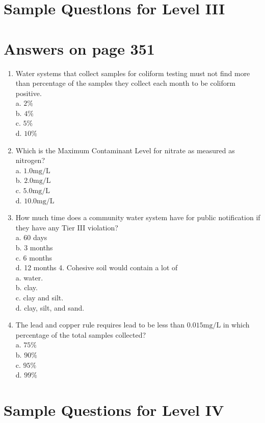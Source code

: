 \documentclass[10pt]{article}
\begin{document}
\section{Sample Questlons for Level III}
\section{Answers on page 351}
\begin{enumerate}
  \item Water systems that collect samples for coliform testing must not find more than percentage of the samples they collect each month to be coliform positive.\\
a. $2 \%$\\
b. $4 \%$\\
c. $5 \%$\\
d. $10 \%$

  \item Which is the Maximum Contaminant Level for nitrate as measured as nitrogen?\\
a. $1.0 \mathrm{mg} / \mathrm{L}$\\
b. $2.0 \mathrm{mg} / \mathrm{L}$\\
c. $5.0 \mathrm{mg} / \mathrm{L}$\\
d. $10.0 \mathrm{mg} / \mathrm{L}$

  \item How much time does a community water system have for public notification if they have any Tier III violation?\\
a. 60 days\\
b. 3 months\\
c. 6 months\\
d. 12 months 4. Cohesive soil would contain a lot of\\
a. water.\\
b. clay.\\
c. clay and silt.\\
d. clay, silt, and sand.

  \item The lead and copper rule requires lead to be less than $0.015 \mathrm{mg} / \mathrm{L}$ in which percentage of the total samples collected?\\
a. $75 \%$\\
b. $90 \%$\\
c. $95 \%$\\
d. $99 \%$

\end{enumerate}

\section{Sample Questions for Level IV}
\end{document}
